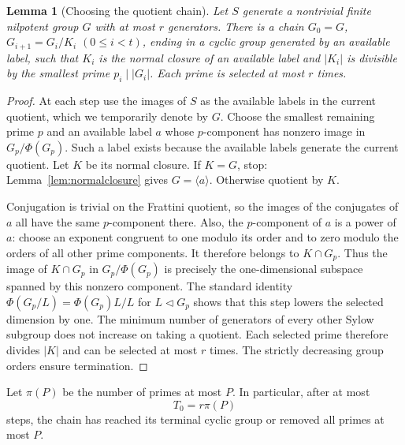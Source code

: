 \documentclass[11pt,a4paper,reqno]{amsart}
\newtheorem{lemma}[theorem]{Lemma}
\theoremstyle{definition}
\theoremstyle{remark}
\numberwithin{equation}{section}
\newcommand{\gen}[1]{\langle #1\rangle}
\begin{document}
\begin{lemma}[Choosing the quotient chain]\label{lem:primechain}
Let $S$ generate a nontrivial finite nilpotent group $G$ with at most $r$ generators. There is a chain $G_0=G$, $G_{i+1}=G_i/K_i$ $(0\le i<t)$, ending in a cyclic group generated by an available label, such that $K_i$ is the normal closure of an available label and $|K_i|$ is divisible by the smallest prime $p_i\mid |G_i|$. Each prime is selected at most $r$ times.
\end{lemma}
\begin{proof}
At each step use the images of $S$ as the available labels in the current quotient, which we temporarily denote by $G$. Choose the smallest remaining prime $p$ and an available label $a$ whose $p$-component has nonzero image in $G_p/\Phi(G_p)$. Such a label exists because the available labels generate the current quotient. Let $K$ be its normal closure. If $K=G$, stop: Lemma~\ref{lem:normalclosure} gives $G=\gen a$. Otherwise quotient by $K$.

Conjugation is trivial on the Frattini quotient, so the images of the conjugates of $a$ all have the same $p$-component there. Also, the $p$-component of $a$ is a power of $a$: choose an exponent congruent to one modulo its order and to zero modulo the orders of all other prime components. It therefore belongs to $K\cap G_p$. Thus the image of $K\cap G_p$ in $G_p/\Phi(G_p)$ is precisely the one-dimensional subspace spanned by this nonzero component. The standard identity $\Phi(G_p/L)=\Phi(G_p)L/L$ for $L\lhd G_p$ shows that this step lowers the selected dimension by one. The minimum number of generators of every other Sylow subgroup does not increase on taking a quotient. Each selected prime therefore divides $|K|$ and can be selected at most $r$ times. The strictly decreasing group orders ensure termination.
\end{proof}

Let $\pi(P)$ be the number of primes at most $P$. In particular, after at most
\begin{equation}\label{eq:Tzero}
 T_0=r\pi(P)
\end{equation}
steps, the chain has reached its terminal cyclic group or removed all primes at most $P$.
\end{document}
